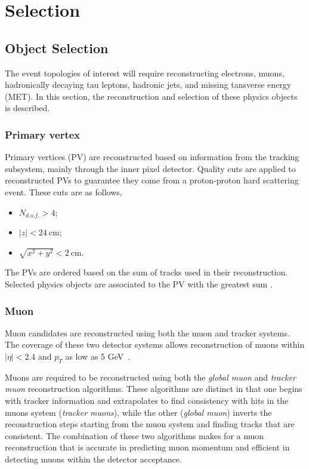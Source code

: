 \chapter{Selection}
\label{sec:slt}




\section{Object Selection}
\label{sec:slt:objectSelection}
The event topologies of interest will require reconstructing electrons, muons, hadronically decaying tau leptons, hadronic jets, and missing tansverse energy (MET).  In this section, the reconstruction and selection of these physics objects is described.



\subsection{Primary vertex}
Primary vertices (PV) are reconstructed based on information from the tracking subsystem, mainly through the inner pixel detector. Quality cuts are applied to reconstructed PVs to guarantee they come from a proton-proton hard scattering event. These cuts are as follows,
\begin{itemize}
    \item $N_{d.o.f.}> 4$;
    \item $\left|z\right| < 24~\mathrm{cm}$; 
    \item $\sqrt{x^{2} + y^{2}} < 2~\mathrm{cm}$.
\end{itemize}
The PVs are ordered based on the sum \pt of tracks used in their reconstruction.  Selected physics objects are associated to the PV with the greatest sum \pt. 






\subsection{Muon}
Muon candidates are reconstructed using both the muon and tracker systems. The coverage of these two detector systems allows reconstruction of muons within $\left|\eta\right| < 2.4$ and $p_{T}$ as low as 5 GeV~\cite{Chatrchyan:2012xi}. 

Muons are required to be reconstructed using both the \emph{global muon} and \emph{tracker muon} reconstruction algorithms.  These algorithms are distinct in that one begins with tracker information and extrapolates to find consistency with hits in the muons system (\emph{tracker muons}), while the other (\emph{global muon}) inverts the reconstruction steps starting from the muon system and finding tracks that are consistent. The combination of these two algorithms makes for a muon reconstruction that is accurate in predicting muon momentum and efficient in detecting muons within the detector acceptance.

